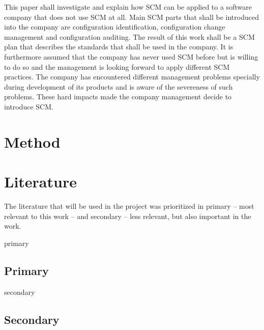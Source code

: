 \documentclass[a4paper]{article}
\begin{document}
This paper shall investigate and explain how SCM can be applied to a software company that does not use SCM at all. Main SCM parts that shall be introduced into the company are configuration identification, configuration change management and configuration auditing. The result of this work shall be a SCM plan that describes the standards that shall be used in the company. It is furthermore assumed that the company has never used SCM before but is willing to do so and the management is looking forward to apply different SCM practices. The company has encountered different management problems specially during development of its products and is aware of the severeness of such problems. These hard impacts made the company management decide to introduce SCM. 

\section{Method}

\newpage
\appendix
\section{Literature}

The literature that will be used in the project was prioritized in primary -- most relevant to this work -- and secondary -- less relevant, but also important in the work. 
\begin{btSect}[alpha]{primary}
\subsection{Primary}
\btPrintAll
\end{btSect}

\begin{btSect}[alpha]{secondary}
\subsection{Secondary}
\btPrintAll
\end{btSect}
\end{document}
